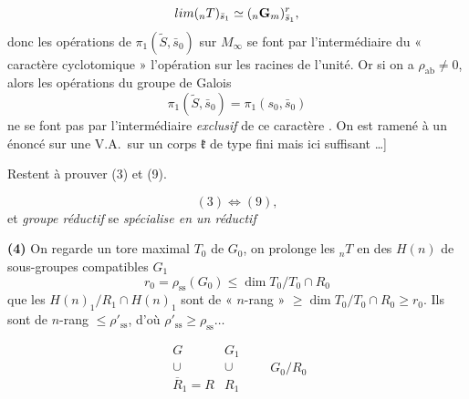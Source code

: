 \documentclass[11pt,a4paper]{article}
\begin{document}

\[
  \varprojlim ({}_nT)_{\bar s_1} \simeq ({}_n\mathbf{G}_m)^{r}_{\bar s_1},
\]
donc les opérations de $\pi_1(\tilde S, \bar s_0)$ sur $M_\infty$ se font
par l'intermédiaire du « caractère cyclotomique » l'opération sur les
racines de l'unité. Or si on a $\rho_{\mathrm{ab}} \neq 0$, alors les
opérations du groupe de Galois
\[
  \pi_1(\tilde S, \bar s_0) = \pi_1(s_0, \bar s_0)
\]
ne se font pas par l'intermédiaire \emph{exclusif} de ce caractère \ill{}.
On est ramené à un énoncé sur une V.A.\ sur un corps $\mathfrak{k}$ de
type fini \ill{} mais ici suffisant …]\note{le « [ » ouvrant manque sur la
page}



Restent à prouver (3) et (9).

\[
  (3) \Longleftrightarrow (9),
\]
et \struck{\ill{}}  \ill{} 
\emph{groupe réductif} se \emph{spécialise en un réductif}

\textbf{(4)} On regarde un tore maximal $T_0$ de $G_0$, on prolonge
les ${}_nT$ en des $H(n)$ de sous-groupes compatibles \ill{} \ill{} \ill{}
$G_1$
\[
  r_0 = \rho_{\mathrm{ss}}(G_0) \leqslant \dim T_0/T_0 \cap R_0
\]
que les $H(n)_1/R_1 \cap H(n)_1$ sont de « $n$-rang »
$\geqslant \dim T_0/T_0 \cap R_0 \geqslant r_0$. Ils sont \ill{} de
$n$-rang $\leqslant \rho'_{\mathrm{ss}}$, d'où $\rho'_{\mathrm{ss}}
\geqslant \rho_{\mathrm{ss}} \ldots$

\[
  \begin{array}{cc}
    G & G_1 \\
    \cup & \cup \\
    \overline{R}_1 = R & R_1
  \end{array}
  \qquad G_0/R_0
\]
\end{document}
